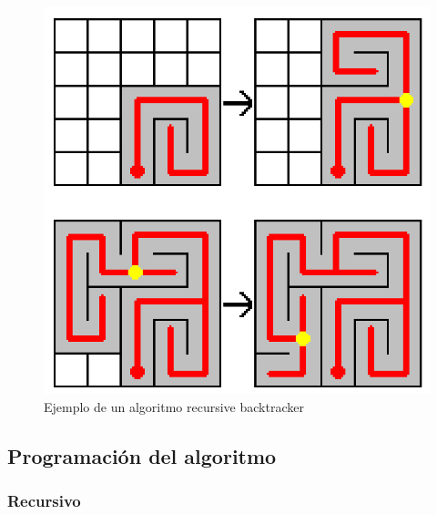\documentclass[12pt,a4paper]{article}
\begin{document}
\begin{figure}[H]
	\centering
	\includegraphics[scale=0.4]{fotos/back_tracker.png}
	\caption{Ejemplo de un algoritmo recursive backtracker \cite{back_tracker}}
	\label{back_tracker}
\end{figure}



\subsection{Programación del algoritmo}
\subsubsection{Recursivo}
\end{document}
